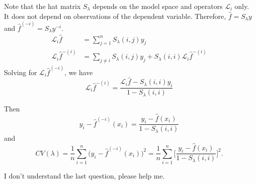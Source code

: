 \begin{solution}
    Note that the hat matrix $S_\lambda$ depends on the model space and operators $\mathcal{L}_{i}$ only. 
    It does not depend on observations of the dependent variable. 
    Therefore, $\hat{f} = S_\lambda y$ and $\hat{f}^{(-i)} = S_\lambda y^{-i}$. 
    \begin{equation*}
    \begin{split} 
        \mathcal{L}_{i} \hat{f} & = \sum_{j=1}^{n} S_\lambda(i, j) y_{j} \\ 
        \mathcal{L}_{i} \hat{f}^{-(i)} & = \sum_{j \neq i} S_\lambda(i, j) y_{j}+ S_\lambda(i, i) \mathcal{L}_{i} \hat{f}^{-(i)}
     \end{split}
    \end{equation*}
    Solving for $\mathcal{L}_{i} \hat{f}^{(-i)}$, we have
    \begin{equation*}
        \mathcal{L}_{i} \hat{f}^{-(i)}=\frac{\mathcal{L}_{i} \hat{f} - S_\lambda(i, i) y_{i}}{1-S_\lambda(i, i)}
    \end{equation*}

    Then 
    \begin{equation*}
        y_i-\hat{f}^{(-i)}(x_i) = \frac{y_i-\hat{f}(x_i)}{1-S_\lambda(i,i)}
    \end{equation*}
    and 
    \begin{equation*}
        CV(\lambda)=\frac1n\sum_{i=1}^n\Big(y_i-\hat{f}^{(-i)}(x_i)\Big)^2 = \frac1n\sum_{i=1}^n\Big[\frac{y_i-\hat{f}(x_i)}{1-S_\lambda(i,i)}\Big]^2.
    \end{equation*}
\end{solution}

I don't understand the last question, please help me. 
